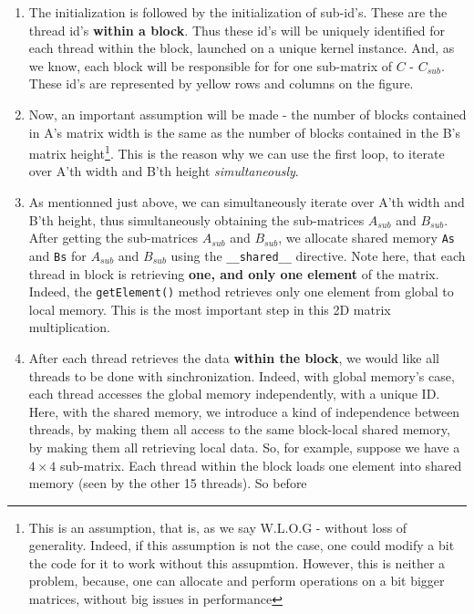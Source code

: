 {\begin{enumerate}
        This gives us the ability to keep 
   track of the sub-matrix within each block. Remember, the multiplication 
   of (sub-)matrices involves accumulation of element-wise multiplication, so we're initializing the temporary sum to $0$.
   \item The initialization is followed by the initialization of sub-id's. These are the thread id's \textbf{within a block}.
   Thus these id's will be uniquely identified for each thread within the block, launched on a unique kernel instance. And, as we know, each block will be responsible for
   for one sub-matrix of $C$ - $C_{sub}$. These id's are represented by yellow rows and columns on the figure.
   \item Now, an important assumption will be made - the number of blocks contained in A's matrix width is the same as the number of 
   blocks contained in the B's matrix height\footnote{This is an assumption, that is, as we say W.L.O.G - without loss of generality. 
   Indeed, if this assumption is not the case, one could modify a bit the code for it to work without this assupmtion.
   However, this is neither a problem, because, one can allocate and perform operations on a bit bigger matrices, without big issues in 
   performance}. This is the reason why we can use the first loop, to iterate over A'th width and B'th height \textit{simultaneously}. 
   \item As mentionned just above, we can simultaneously iterate over A'th width and B'th height, thus simultaneously obtaining the sub-matrices 
   $A_{sub}$ and $B_{sub}$. After getting the sub-matrices $A_{sub}$ and $B_{sub}$, we allocate shared memory \verb|As| and \verb|Bs| for 
   $A_{sub}$ and $B_{sub}$ using the \verb|__shared__| directive. Note here, that each thread in block is retrieving \textbf{one, and only one element} of the matrix. 
   Indeed, the \verb|getElement()| method retrieves only one element from global to local memory. This is the most important step in this 2D matrix multiplication.
   \item After each thread retrieves the data \textbf{within the block}, we would like all threads to be done with sinchronization. Indeed, with global memory's case, 
   each thread accesses the global memory independently, with a unique ID. Here, with the shared memory, we introduce a kind of independence between threads, by making them all access to the same block-local shared memory, by 
   making them all retrieving local data. So, for example, suppose we have a $4\times 4$ sub-matrix. Each thread within the block loads one element into shared memory (seen by the other 15 threads). So before 

\end{enumerate}}
